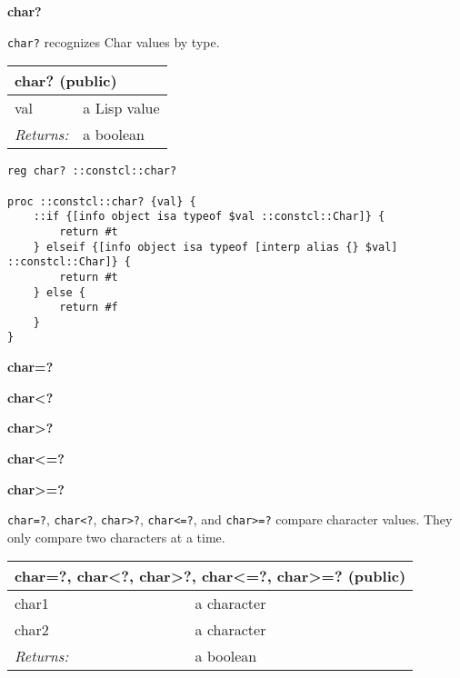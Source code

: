 \documentclass{report}
\begin{document}
\textbf{char?}


\texttt{char?} recognizes Char values by type.

\begin{tabular}{ |l l| }
\hline
\multicolumn{2}{|l|}{char? (public)} \\
\hline
val & a Lisp value \\
\textit{Returns:} & a boolean \\
\hline
\end{tabular}

\noindent\makebox[\linewidth]{\rule{\linewidth}{0.4pt}}
\begin{lstlisting}
reg char? ::constcl::char?
 
proc ::constcl::char? {val} {
    ::if {[info object isa typeof $val ::constcl::Char]} {
        return #t
    } elseif {[info object isa typeof [interp alias {} $val] ::constcl::Char]} {
        return #t
    } else {
        return #f
    }
}
\end{lstlisting}
\noindent\makebox[\linewidth]{\rule{\linewidth}{0.4pt}}

\textbf{char=?}


\textbf{char<?}


\textbf{char>?}


\textbf{char<=?}


\textbf{char>=?}


\texttt{char=?}, \texttt{char<?}, \texttt{char>?}, \texttt{char<=?}, and \texttt{char>=?} compare character values. They only compare two characters at a time.

\begin{tabular}{ |l l| }
\hline
\multicolumn{2}{|l|}{char=?, char<?, char>?, char<=?, char>=? (public)} \\
\hline
char1 & a character \\
char2 & a character \\
\textit{Returns:} & a boolean \\
\hline
\end{tabular}
\end{document}
